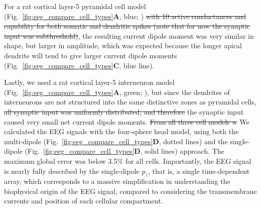 \documentclass[preprint,10pt,authoryear]{elsarticle}
\newcommand{\hlb}[2][NavyBlue]{ {\sethlcolor{#1} \hl{#2}} }
\newcommand{\snnote}[1]{\color{white}{\hlb{SN: #1 }}\color{black}}
\newcommand{\sntxt}[1]{{\color{NavyBlue}#1}}
\begin{document}
For a rat cortical layer-5 pyramidal cell model (Fig.~\ref{fig:eeg_compare_cell_types}\textbf{A}, blue; \cite{HAY2011}) \sntxt{\sout{with 10 active conductances and capability for both somatic and dendritic spikes (note that for now the synaptic input was subthreshold)}}, the resulting current dipole moment was very similar in shape, but larger in amplitude, which was expected because the longer apical dendrite will tend to give larger current dipole moments (Fig.~\ref{fig:eeg_compare_cell_types}\textbf{C}, blue line).

Lastly, we used a rat cortical layer-5 interneuron model (Fig.~\ref{fig:eeg_compare_cell_types}\textbf{A}, green; \cite{MARKRAM2015}), but since the dendrites of interneurons are not structured into the same distinctive zones as pyramidal cells, \sntxt{\sout{ all synaptic input was uniformly distributed, and therefore} the synaptic input} caused very small net current dipole moments.
\sntxt{\sout{From all three cell models w} W}e calculated the EEG signal\sntxt{s} with the four-sphere head model, using both the multi-dipole (Fig.~\ref{fig:eeg_compare_cell_types}\textbf{D}, dotted lines) and the single-dipole (Fig.~\ref{fig:eeg_compare_cell_types}\textbf{D}, solid lines) approach. \sntxt{The maximum global error was below 3.5$\%$ for all cells.
Importantly, }
the EEG signal is nearly fully described by the single-dipole $p_z$, that is, a single time-dependent array, which corresponds to a massive simplification in understanding the biophysical origin of the EEG signal, compared to considering the transmembrane currents and position of each cellular compartment. 
\end{document}
